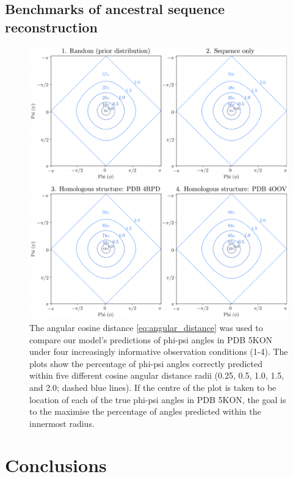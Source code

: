 \documentclass[nogrid]{MBE}%
\begin{document}
\subsection{Benchmarks of ancestral sequence reconstruction}
\begin{figure}
	\centering
	\includegraphics[width=2.0\columnwidth]{figures/benchmarks-target-plot.pdf}
	\caption{The angular cosine distance \eqref{eq:angular_distance} was used to compare our model's predictions of phi-psi angles in PDB 5KON under four increasingly informative observation conditions (1-4). The plots show the percentage of phi-psi angles correctly predicted within five different cosine angular distance radii (0.25, 0.5, 1.0, 1.5, and 2.0; dashed blue lines). If the centre of the plot is taken to be location of each of the true phi-psi angles in PDB 5KON, the goal is to the maximise the percentage of angles predicted within the innermost radius.}%
	\label{fig:benchmarkstarget}%
\end{figure}
	
\section{Conclusions}

\end{document}
